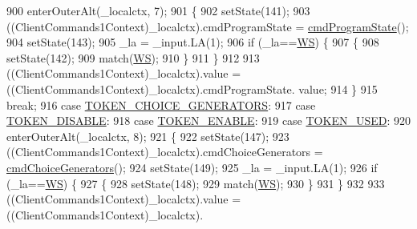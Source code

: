 \begin{DoxyCode}
900         enterOuterAlt(\_localctx, 7);
901         \{
902         setState(141);
903         ((ClientCommands1Context)\_localctx).cmdProgramState = \hyperlink{classgov_1_1nasa_1_1jpf_1_1inspector_1_1client_1_1parser_1_1_console_grammar_parser_ad1e3d393488b8ab29c12899535ecf1cd}{cmdProgramState}();
904         setState(143);
905         \_la = \_input.LA(1);
906         \textcolor{keywordflow}{if} (\_la==\hyperlink{classgov_1_1nasa_1_1jpf_1_1inspector_1_1client_1_1parser_1_1_console_grammar_parser_a6914a3a3adbc350b12a7df9d1b24abf1}{WS}) \{
907           \{
908           setState(142);
909           match(\hyperlink{classgov_1_1nasa_1_1jpf_1_1inspector_1_1client_1_1parser_1_1_console_grammar_parser_a6914a3a3adbc350b12a7df9d1b24abf1}{WS});
910           \}
911         \}
912 
913          ((ClientCommands1Context)\_localctx).value =  ((ClientCommands1Context)\_localctx).cmdProgramState.
      value; 
914         \}
915         \textcolor{keywordflow}{break};
916       \textcolor{keywordflow}{case} \hyperlink{classgov_1_1nasa_1_1jpf_1_1inspector_1_1client_1_1parser_1_1_console_grammar_parser_abc82b513c43997c7369162a20cb4887b}{TOKEN\_CHOICE\_GENERATORS}:
917       \textcolor{keywordflow}{case} \hyperlink{classgov_1_1nasa_1_1jpf_1_1inspector_1_1client_1_1parser_1_1_console_grammar_parser_a90e268d3330c4dd5955ee838092f75ff}{TOKEN\_DISABLE}:
918       \textcolor{keywordflow}{case} \hyperlink{classgov_1_1nasa_1_1jpf_1_1inspector_1_1client_1_1parser_1_1_console_grammar_parser_a470e2b55da42238181711a5c607b3fd5}{TOKEN\_ENABLE}:
919       \textcolor{keywordflow}{case} \hyperlink{classgov_1_1nasa_1_1jpf_1_1inspector_1_1client_1_1parser_1_1_console_grammar_parser_af6dbf6c25f48d915dc7c5ea8e47a581f}{TOKEN\_USED}:
920         enterOuterAlt(\_localctx, 8);
921         \{
922         setState(147);
923         ((ClientCommands1Context)\_localctx).cmdChoiceGenerators = 
      \hyperlink{classgov_1_1nasa_1_1jpf_1_1inspector_1_1client_1_1parser_1_1_console_grammar_parser_ae1f2f3e73caeaccbd742f2842d4c986a}{cmdChoiceGenerators}();
924         setState(149);
925         \_la = \_input.LA(1);
926         \textcolor{keywordflow}{if} (\_la==\hyperlink{classgov_1_1nasa_1_1jpf_1_1inspector_1_1client_1_1parser_1_1_console_grammar_parser_a6914a3a3adbc350b12a7df9d1b24abf1}{WS}) \{
927           \{
928           setState(148);
929           match(\hyperlink{classgov_1_1nasa_1_1jpf_1_1inspector_1_1client_1_1parser_1_1_console_grammar_parser_a6914a3a3adbc350b12a7df9d1b24abf1}{WS});
930           \}
931         \}
932 
933          ((ClientCommands1Context)\_localctx).value =  ((ClientCommands1Context)\_localctx).

\end{DoxyCode}
